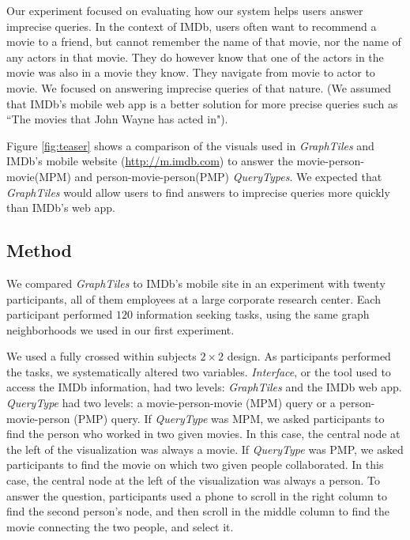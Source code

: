 \documentclass{sigchi}
\begin{document}
Our experiment focused on evaluating how our system helps users answer imprecise queries. In the context of IMDb, users often want to recommend a movie to a friend, but cannot remember the name of that movie, nor the name of any actors in that movie. They do however know that one of the actors in the movie was also in a movie they know. They navigate from movie to actor to movie. We focused on answering imprecise queries of that nature. (We assumed that IMDb's mobile web app is a better solution for more precise queries such as ``The movies that John Wayne has acted in"). 

Figure \ref{fig:teaser} shows a comparison of the visuals used in \textit{GraphTiles} and IMDb's mobile website (\url{http://m.imdb.com}) to answer the movie-person-movie(MPM) and person-movie-person(PMP) \textit{QueryTypes}. We expected that \textit{GraphTiles} would allow users to find answers to imprecise queries more quickly than IMDb's web app.




\subsection{Method}

We compared \textit{GraphTiles} to IMDb's mobile site in an experiment with twenty participants, all of them employees at a large corporate research center. Each participant performed $120$ information seeking tasks, using the same graph neighborhoods we used in our first experiment.

We used a fully crossed within subjects $2 \times 2$ design. As participants performed the tasks, we systematically altered two variables. \textit{Interface}, or the tool used to access the IMDb information, had two levels: \textit{GraphTiles} and the IMDb web app. \textit{QueryType} had two levels: a movie-person-movie (MPM) query or a person-movie-person (PMP) query. If \textit{QueryType} was MPM, we asked participants to find the person who worked in two given movies. In this case, the central node at the left of the visualization was always a movie. If \textit{QueryType} was PMP, we asked participants to find the movie on which two given people collaborated. In this case, the central node at the left of the visualization was always a person. To answer the question, participants used a phone to scroll in the right column to find the second person's node, and then scroll in the middle column to find the movie connecting the two people, and select it.
\end{document}
